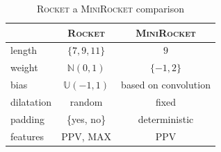\documentclass{article}
\newcommand\ROCKET{\textsc{Rocket}\xspace}
\newcommand\MINIROCKET{\textsc{MiniRocket}\xspace}
\newcommand\unuglifytable{\centering\renewcommand{\arraystretch}{1.5}}
\begin{document}
\begin{table}[!h]
    \unuglifytable
    \begin{tabular}{l | c c}
        \hline
                   & \ROCKET              & \MINIROCKET           \\
        \hline
        length     & $\{7, 9, 11\}$       & $9$                   \\
        weight     & $\mathbb{N}(0, 1)$   & $\{-1, 2\}$           \\
        bias       & $\mathbb{U}(-1, 1)$  & based on convolution  \\
        dilatation & random               & fixed                 \\
        padding    & \{yes, no\}          & deterministic         \\
        features   & PPV, MAX             & PPV                   \\
        \hline
    \end{tabular}
    \caption{\ROCKET a \MINIROCKET comparison}\label{tab:rocketvsminirocket}
\end{table}
\end{document}
